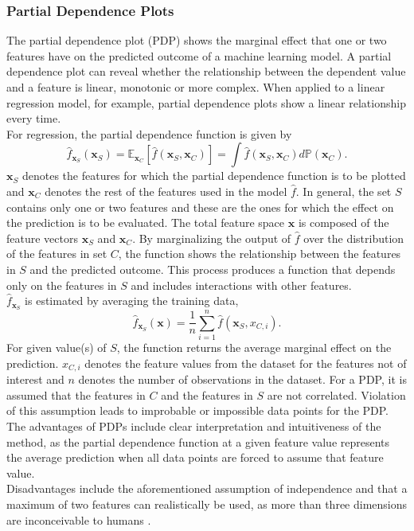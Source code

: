 \subsubsection*{Partial Dependence Plots}
The partial dependence plot (PDP) shows the marginal effect that one or two features have on the predicted outcome of a machine learning model. A partial dependence plot can reveal whether the relationship between the dependent value and a feature is linear, monotonic or more complex. When applied to a linear regression model, for example, partial dependence plots show a linear relationship every time. \\
For regression, the partial dependence function is given by
\begin{equation}
    \widehat{f}_{\pmb{x}_S}\left(\pmb{x}_S\right)=\mathbb{E}_{\pmb{x}_C}\left[\widehat{f}\left(\pmb{x}_S, \pmb{x}_C\right)\right] = \int\widehat{f}\left(\pmb{x}_S,\pmb{x}_C\right)d\mathbb{P}\left(\pmb{x}_C\right).
\end{equation}
$\pmb{x}_S$ denotes the features for which the partial dependence function is to be plotted and $\pmb{x}_C$ denotes the rest of the features used in the model $\widehat{f}$. In general, the set $S$ contains only one or two features and these are the ones for which the effect on the prediction is to be evaluated. The total feature space $\pmb{x}$ is composed of the feature vectors $\pmb{x}_S$ and $\pmb{x}_C$. By marginalizing the output of $\widehat{f}$ over the distribution of the features in set $C$, the function shows the relationship between the features in $S$ and the predicted outcome. This process produces a function that depends only on the features in $S$ and includes interactions with other features. \\
$\widehat{f}_{\pmb{x}_S}$ is estimated by averaging the training data,
\begin{equation}
    \widehat{f}_{\pmb{x}_S}\left(\pmb{x}\right)=\frac{1}{n}\sum_{i=1}^n\widehat{f}\left(\pmb{x}_S, x_{C, i}\right).
\end{equation}
For given value(s) of $S$, the function returns the average marginal effect on the prediction. $x_{C,i}$ denotes the feature values from the dataset for the features not of interest and $n$ denotes the number of observations in the dataset. For a PDP, it is assumed that the features in $C$ and the features in $S$ are not correlated. Violation of this assumption leads to improbable or impossible data points for the PDP. \\
The advantages of PDPs include clear interpretation and intuitiveness of the method, as the partial dependence function at a given feature value represents the average prediction when all data points are forced to assume that feature value. \\
Disadvantages include the aforementioned assumption of independence and that a maximum of two features can realistically be used, as more than three dimensions are inconceivable to humans \autocite[][]{friedman2001greedy, molnar2020interpretable}.
